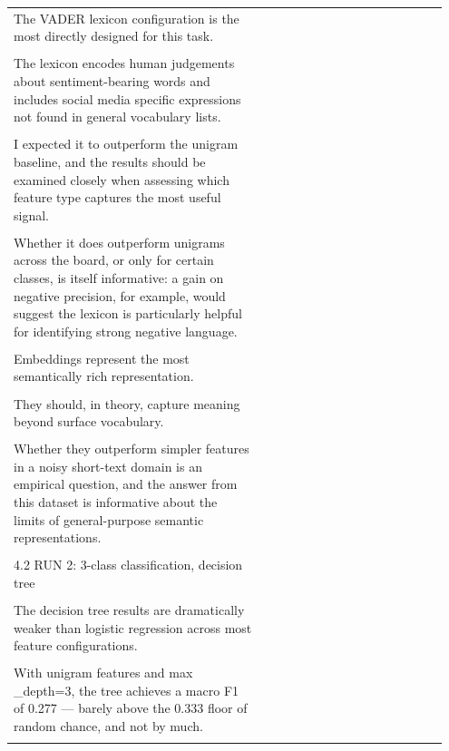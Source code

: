 \documentclass[11pt]{article}
\begin{document}
\begin{longtable}{|p{0.55\linewidth}|p{0.40\linewidth}|}
\hline
\rule{0pt}{3.5cm} & \\
\hline
The VADER lexicon configuration is the most directly designed for this task. & \\[2pt]
\hline
\rule{0pt}{3.5cm} & \\
\hline
The lexicon encodes human judgements about sentiment-bearing words and includes social media specific expressions not found in general vocabulary lists. & \\[2pt]
\hline
\rule{0pt}{3.5cm} & \\
\hline
I expected it to outperform the unigram baseline, and the results should be examined closely when assessing which feature type captures the most useful signal. & \\[2pt]
\hline
\rule{0pt}{3.5cm} & \\
\hline
Whether it does outperform unigrams across the board, or only for certain classes, is itself informative: a gain on negative precision, for example, would suggest the lexicon is particularly helpful for identifying strong negative language. & \\[2pt]
\hline
\rule{0pt}{3.5cm} & \\
\hline
Embeddings represent the most semantically rich representation. & \\[2pt]
\hline
\rule{0pt}{3.5cm} & \\
\hline
They should, in theory, capture meaning beyond surface vocabulary. & \\[2pt]
\hline
\rule{0pt}{3.5cm} & \\
\hline
Whether they outperform simpler features in a noisy short-text domain is an empirical question, and the answer from this dataset is informative about the limits of general-purpose semantic representations. & \\[2pt]
\hline
\rule{0pt}{3.5cm} & \\
\hline
4.2 RUN 2: 3-class classification, decision tree & \\[2pt]
\hline
\rule{0pt}{3.5cm} & \\
\hline
The decision tree results are dramatically weaker than logistic regression across most feature configurations. & \\[2pt]
\hline
\rule{0pt}{3.5cm} & \\
\hline
With unigram features and max \_depth=3, the tree achieves a macro F1 of 0.277 --- barely above the 0.333 floor of random chance, and not by much. & \\[2pt]
\hline
\rule{0pt}{3.5cm} & \\

\end{longtable}
\end{document}
